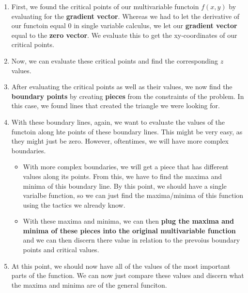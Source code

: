 \documentclass{report}
\begin{document}
\begin{sloppypar}
\begin{enumerate}
  \item First, we found the critical points
        of our multivariable functoin $ f(x,y)$ by
        evaluating for the \textbf{gradient vector}.
        Whereas we had to let the derivative
        of our functoin equal 0 in single variable
        calculus, we let our \textbf{gradient vector}
        equal to the \textbf{zero vector}. We
        evaluate this to get the xy-coordinates
        of our critical points.
  \item Now, we can evaluate these critical points
        and find the corresponding $ z $ values.
  \item After evaluating the critical points
        as well as their values, we now find
        the \textbf{boundary points} by creating
        \textbf{pieces} from the constraints of
        the problem. In this case, we found
        lines that created the triangle we were looking
        for.
  \item With these boundary lines, again, we
        want to evaluate the values of the functoin
        along hte points of these boundary lines.
        This might be very easy, as they might just
        be zero. However, oftentimes, we will
        have more complex boundaries.
        \begin{itemize}
          \item With more complex boundaries, we
                will get a piece that has
                different values along its points.
                From this, we have to find
                the maxima and minima of this boundary
                line. By this point, we should
                have a single varialbe function,
                so we can just find the
                maxima/minima of this function
                using the tactics we already know.
          \item With these maxima and minima,
                we can then \textbf{plug
                the maxima and minima of these pieces
                into the original multivariable
                function} and we can then discern
                there value in relation to the
                prevoius boundary points and critical
                values.
        \end{itemize}
  \item At this point, we should now have
        all of the values of the most important parts
        of the function. We can now just compare
        these values and discern what the maxima and
        minima are of the general funciton.



\end{enumerate}
\end{sloppypar}
\end{document}
